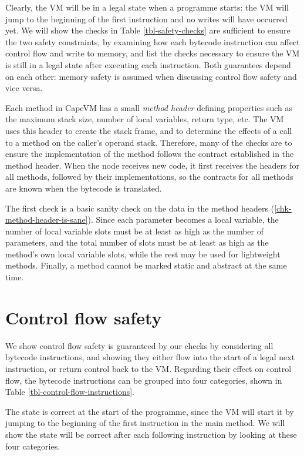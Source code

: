 Clearly, the VM will be in a legal state when a programme starts: the VM will jump to the beginning of the first instruction and no writes will have occurred yet. We will show the checks in Table \ref{tbl-safety-checks} are sufficient to ensure the two safety constraints, by examining how each bytecode instruction can affect control flow and write to memory, and list the checks necessary to ensure the VM is still in a legal state after executing each instruction. Both guarantees depend on each other: memory safety is assumed when discussing control flow safety and vice versa.

Each method in CapeVM has a small \emph{method header} defining properties such as the maximum stack size, number of local variables, return type, etc. The VM uses this header to create the stack frame, and to determine the effects of a call to a method on the caller's operand stack. Therefore, many of the checks are to ensure the implementation of the method follows the contract established in the method header. When the node receives new code, it first receives the headers for all methods, followed by their implementations, so the contracts for all methods are known when the bytecode is translated.

The first check is a basic sanity check on the data in the method headers (\ref{chk-method-header-is-sane}). Since each parameter becomes a local variable, the number of local variable slots must be at least as high as the number of parameters, and the total number of slots must be at least as high as the method's own local variable slots, while the rest may be used for lightweight methods. Finally, a method cannot be marked static and abstract at the same time.

\section{Control flow safety}
We show control flow safety is guaranteed by our checks by considering all bytecode instructions, and showing they either flow into the start of a legal next instruction, or return control back to the VM. Regarding their effect on control flow, the bytecode instructions can be grouped into four categories, shown in Table \ref{tbl-control-flow-instructions}.

The state is correct at the start of the programme, since the VM will start it by jumping to the beginning of the first instruction in the main method. We will show the state will be correct after each following instruction by looking at these four categories.

